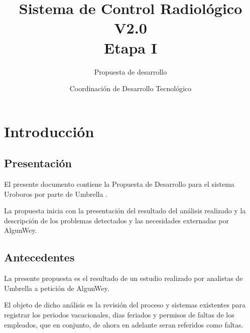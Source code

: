 \documentclass[10pt]{book}
\title{Sistema de Control Radiológico V2.0\\ Etapa I}
\subtitle{\bigskip Propuesta de desarrollo}
\author{Coordinación de Desarrollo Tecnológico}
\newcommand{\nombreProyecto}{Uroboros }
\newcommand{\empresa}{Umbrella }
\newcommand{\cliente}{AlgunWey}
\begin{document}
\pagestyle{empty}
\maketitle
\frontmatter
\tableofcontents
\mainmatter
\pagestyle{fancy}


\chapter{Introducción} 

\section{Presentación}

	El presente documento contiene la Propuesta de Desarrollo para el sistema \nombreProyecto      por parte de  \empresa.
	
	La propuesta inicia con la presentación del resultado del análisis realizado y la descripción de los problemas detectados y las necesidades externadas por \cliente.

\section{Antecedentes} 


	La presente propuesta es el resultado de un estudio realizado por analistas de \empresa a petición de \cliente.
	
	El objeto de dicho análisis es la revisión del proceso y sistemas existentes para registrar los periodos vacacionales, dias feriados y permisos de faltas de los empleados, que en conjunto, de ahora en adelante seran referidos como faltas. 
	
\end{document}
